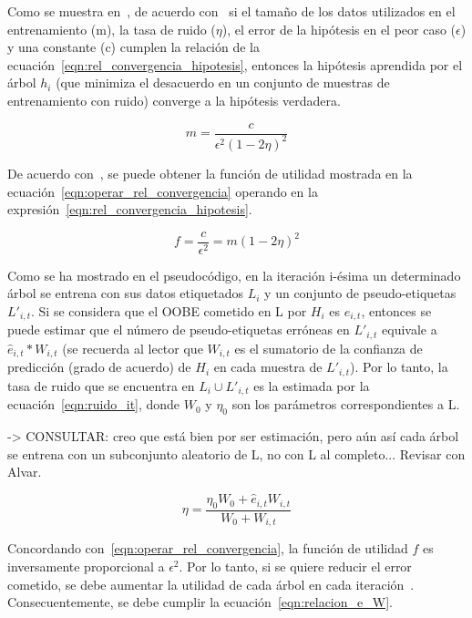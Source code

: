 Como se muestra en~\cite{zhou2021SemisupervisedRecommendationAttack}, de acuerdo con~\cite{noisyExamplesCoforest1988Dana} si el tamaño de los datos utilizados en el entrenamiento (m), la tasa de ruido ($\eta$), el error de la hipótesis en el peor caso ($\epsilon$) y una constante (c) cumplen la relación de la ecuación~\ref{eqn:rel_convergencia_hipotesis}, entonces la hipótesis aprendida por el árbol $h_{i}$ (que minimiza el desacuerdo en un conjunto de muestras de entrenamiento con ruido) converge a la hipótesis verdadera.

\begin{equation}\label{eqn:rel_convergencia_hipotesis} m = \frac{c}{\epsilon^{2}(1-2\eta)^{2}} \end{equation} 

De acuerdo con~\cite{zhou2021SemisupervisedRecommendationAttack}, se puede obtener la función de utilidad mostrada en la ecuación~\ref{eqn:operar_rel_convergencia} operando en la expresión~\ref{eqn:rel_convergencia_hipotesis}.

\begin{equation}\label{eqn:operar_rel_convergencia} f = \frac{c}{\epsilon^{2}} = m(1-2\eta)^{2} \end{equation} 

Como se ha mostrado en el pseudocódigo, en la iteración i-ésima un determinado árbol se entrena con sus datos etiquetados $L_{i}$ y un conjunto de pseudo-etiquetas $L'_{i,t}$. Si se considera que el OOBE cometido en L por $H_{i}$ es $\hat{e}_{i,t}$, entonces se puede estimar que el número de pseudo-etiquetas erróneas en $L'_{i,t}$ equivale a $\hat{e}_{i,t} * W_{i,t}$ (se recuerda al lector que $W_{i,t}$ es el sumatorio de la confianza de predicción (grado de acuerdo) de $H_{i}$ en cada muestra de $L'_{i,t}$). Por lo tanto, la tasa de ruido que se encuentra en $L_{i} \cup L'_{i,t}$ es la estimada por la ecuación~\ref{eqn:ruido_it}, donde $W_0$ y $\eta_0$ son los parámetros correspondientes a L. 

-> CONSULTAR: creo que está bien por ser estimación, pero aún así cada árbol se entrena con un subconjunto aleatorio de L, no con L al completo... Revisar con Alvar.

\begin{equation}\label{eqn:ruido_it} \eta = \frac{\eta_{0}W_{0} + \hat{e}_{i,t}W_{i,t}}{W_{0} + W_{i,t}} \end{equation} 

Concordando con~\ref{eqn:operar_rel_convergencia}, la función de utilidad $f$ es inversamente proporcional a $\epsilon^2$. Por lo tanto, si se quiere reducir el error cometido, se debe aumentar la utilidad de cada árbol en cada iteración~\cite{zhou2021SemisupervisedRecommendationAttack}. Consecuentemente, se debe cumplir la ecuación~\ref{eqn:relacion_e_W}. 

